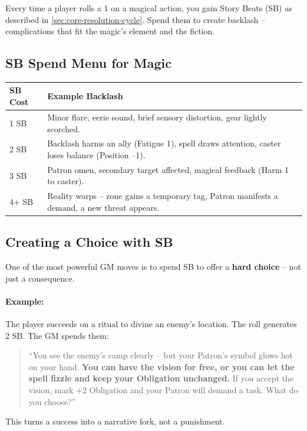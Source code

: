Every time a player rolls a 1 on a magical action, you gain Story Beats (SB) as described in \ref{sec:core-resolution-cycle}. Spend them to create backlash – complications that fit the magic’s element and the fiction.

\subsection*{SB Spend Menu for Magic}
\begin{tcolorbox}[title=Spend SB on Magical Complications, colback=white!97!gray, colframe=black!80!gray]
\begin{tabularx}{\textwidth}{lX}
\toprule
\textbf{SB Cost} & \textbf{Example Backlash} \\
\midrule
1 SB & Minor flare, eerie sound, brief sensory distortion, gear lightly scorched. \\
2 SB & Backlash harms an ally (Fatigue 1), spell draws attention, caster loses balance (Position –1). \\
3 SB & Patron omen, secondary target affected, magical feedback (Harm 1 to caster). \\
4+ SB & Reality warps – zone gains a temporary tag, Patron manifests a demand, a new threat appears. \\
\bottomrule
\end{tabularx}
\end{tcolorbox}

\subsection*{Creating a Choice with SB}
\label{subsec:sb-choice}
One of the most powerful GM moves is to spend SB to offer a \textbf{hard choice} – not just a consequence.

\paragraph{Example:}
The player succeeds on a ritual to divine an enemy’s location. The roll generates 2 SB. The GM spends them:
\begin{quote}
“You see the enemy’s camp clearly – but your Patron’s symbol glows hot on your hand. \textbf{You can have the vision for free, or you can let the spell fizzle and keep your Obligation unchanged.} If you accept the vision, mark +2 Obligation and your Patron will demand a task. What do you choose?”
\end{quote}
This turns a success into a narrative fork, not a punishment.

